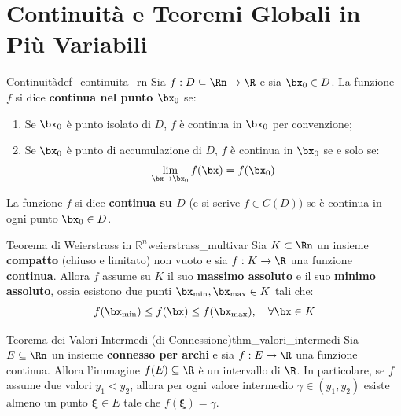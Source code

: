\section{Continuità e Teoremi Globali in Più Variabili}

\begin{definizione}{Continuità}{def_continuita_rn}
Sia $f: D \subseteq \Rn \to \R$ e sia $\bx_0 \in D$. La funzione $f$ si dice \textbf{continua nel punto $\bx_0$} se:
\begin{enumerate}
    \item Se $\bx_0$ è punto isolato di $D$, $f$ è continua in $\bx_0$ per convenzione;
    \item Se $\bx_0$ è punto di accumulazione di $D$, $f$ è continua in $\bx_0$ se e solo se:
    \[
    \lim_{\bx \to \bx_0} f(\bx) = f(\bx_0)
    \]
\end{enumerate}
La funzione $f$ si dice \textbf{continua su $D$} (e si scrive $f \in C(D)$) se è continua in ogni punto $\bx_0 \in D$.
\end{definizione}

\begin{teorema}{Teorema di Weierstrass in $\mathbb{R}^n$}{weierstrass_multivar}
Sia $K \subset \Rn$ un insieme \textbf{compatto} (chiuso e limitato) non vuoto e sia $f: K \to \R$ una funzione \textbf{continua}.
Allora $f$ assume su $K$ il suo \textbf{massimo assoluto} e il suo \textbf{minimo assoluto}, ossia esistono due punti $\bx_{\min}, \bx_{\max} \in K$ tali che:
\[
f(\bx_{\min}) \le f(\bx) \le f(\bx_{\max}), \quad \forall \bx \in K
\]
\end{teorema}

\begin{teorema}{Teorema dei Valori Intermedi (di Connessione)}{thm_valori_intermedi}
Sia $E \subseteq \Rn$ un insieme \textbf{connesso per archi} e sia $f: E \to \R$ una funzione continua. Allora l'immagine $f(E) \subseteq \R$ è un intervallo di $\R$. In particolare, se $f$ assume due valori $y_1 < y_2$, allora per ogni valore intermedio $\gamma \in (y_1, y_2)$ esiste almeno un punto $\boldsymbol{\xi} \in E$ tale che $f(\boldsymbol{\xi}) = \gamma$.
\end{teorema}
